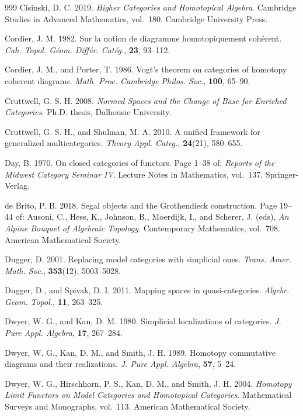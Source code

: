 \begin{thebibliography}{999}
 Cisinski, D. C. 2019. \emph{Higher Categories and Homotopical
  Algebra}. Cambridge Studies in Advanced Mathematics, vol.~180. Cambridge
  University Press.

 Cordier, J. M. 1982. Sur la notion de diagramme homotopiquement
  cohérent. \emph{Cah. Topol. Géom. Différ. Catég.}, \textbf{23}, 93--112.

 Cordier, J. M., and Porter, T. 1986. Vogt's theorem on categories
  of homotopy coherent diagrams. \emph{Math. Proc. Cambridge Philos. Soc.},
  \textbf{100}, 65--90.

 Cruttwell, G. S. H. 2008. \emph{Normed Spaces and the Change of
  Base for Enriched Categories}. Ph.D. thesis, Dalhousie University.

 Cruttwell, G. S. H., and Shulman, M. A. 2010. A unified framework
  for generalized multicategories. \emph{Theory Appl. Categ.},
  \textbf{24}(21), 580--655.

 Day, B. 1970. On closed categories of functors. Page 1--38 of:
  \emph{Reports of the Midwest Category Seminar IV}. Lecture Notes in
  Mathematics, vol.~137. Springer-Verlag.

 de Brito, P. B. 2018. Segal objects and the Grothendieck
  construction. Page 19--44 of: Ausoni, C., Hess, K., Johnson, B., Moerdijk,
  I., and Scherer, J. (eds), \emph{An Alpine Bouquet of Algebraic Topology}.
  Contemporary Mathematics, vol.~708. American Mathematical Society.

 Dugger, D. 2001. Replacing model categories with simplicial ones.
  \emph{Trans. Amer. Math. Soc.}, \textbf{353}(12), 5003--5028.

 Dugger, D., and Spivak, D. I. 2011. Mapping spaces in
  quasi-categories. \emph{Algebr. Geom. Topol.}, \textbf{11}, 263--325.

 Dwyer, W. G., and Kan, D. M. 1980. Simplicial localizations of
  categories. \emph{J. Pure Appl. Algebra}, \textbf{17}, 267--284.

 Dwyer, W. G., Kan, D. M., and Smith, J. H. 1989. Homotopy
  commutative diagrams and their realizations. \emph{J. Pure Appl. Algebra},
  \textbf{57}, 5--24.

 Dwyer, W. G., Hirschhorn, P. S., Kan, D. M., and Smith, J. H.
  2004. \emph{Homotopy Limit Functors on Model Categories and Homotopical
  Categories}. Mathematical Surveys and Monographs, vol.~113. American
  Mathematical Society.


\end{thebibliography}

